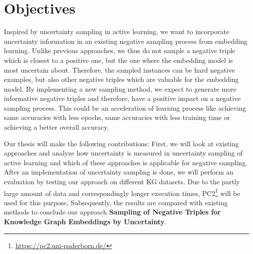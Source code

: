 \section{Objectives}
\label{sec:objectives}

Inspired by uncertainty sampling in active learning, we want to incorporate uncertainty information in an existing negative sampling process from embedding learning.
Unlike previous approaches, we thus do not sample a negative triple which is closest to a positive one, but the one where the embedding model is most uncertain about.
Therefore, the sampled instances can be hard negative examples, but also other negative triples which are valuable for the embedding model.
By implementing a new sampling method, we expect to generate more informative negative triples and therefore, have a positive impact on a negative sampling process.
This could be an acceleration of learning process like achieving same accuracies with less epochs, same accuracies with less training time or achieving a better overall accuracy.

Our thesis will make the following contributions:
First, we will look at existing approaches and analyze how uncertainty is measured in uncertainty sampling of active learning and which of these approaches is applicable for negative sampling.
After an implementation of uncertainty sampling is done, 
we will perform an evaluation by testing our approach on different \ac{KG} datasets.
Due to the partly large amount of data and correspondingly longer execution times, \ac{PC2}\footnote{\url{https://pc2.uni-paderborn.de/}} will be used for this purpose,
Subsequently, the results are compared with existing methods to conclude our approach \textbf{Sampling of Negative Triples for Knowledge Graph Embeddings by Uncertainty}.








